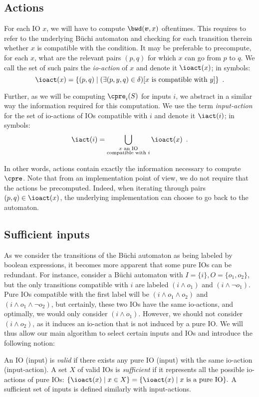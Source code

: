 \documentclass[runningheads,a4paper]{llncs}
\begin{document}
\subsection{Actions}

For each IO \(x\), we will have to compute \(\bwd(\vec{v}, x)\) oftentimes.  This
requires to refer to the underlying Büchi automaton and checking for each
transition therein whether \(x\) is compatible with the condition.  It may be
preferable to precompute, for each \(x\), what are the relevant pairs \((p, q)\) for
which \(x\) can go from \(p\) to \(q\).  We call the set of such pairs the
\emph{io-action} of \(x\) and denote it \(\ioact(x)\); in symbols:
\[\ioact(x) = \{(p, q) \mid (\exists (p, y, q) \in \delta)[x \text{ is compatible with }
y]\}\enspace.\]

Further, as we will be computing \(\cpre_i(S)\) for inputs \(i\), we abstract in a
similar way the information required for this computation.  We use the term
\emph{input-action} for the set of io-actions of IOs compatible with \(i\) and denote
it \(\iact(i)\); in symbols:
\[\iact(i) = \bigcup_{\substack{x \text{ an IO}\\\text{compatible with }i}} \ioact(x) \enspace.\]

In other words, actions contain exactly the information necessary to compute
\(\cpre\).  Note that from an implementation point of view, we do not require that
the actions be precomputed.  Indeed, when iterating through pairs
\((p, q) \in \ioact(x)\), the underlying implementation can choose to go back to the
automaton.

\subsection{Sufficient inputs}\label{sec:sufficient}

As we consider the transitions of the Büchi automaton as being labeled by
boolean expressions, it becomes more apparent that some pure IOs can be
redundant.  For instance, consider a Büchi automaton with
\(I = \{i\}, O = \{o_1, o_2\}\), but the only transitions compatible with \(i\) are
labeled \((i \land o_1)\) and \((i \land \neg o_1)\).  Pure IOs compatible with the first
label will be \((i \land o_1 \land o_2)\) and \((i \land o_1 \land \neg o_2)\), but
certainly, these two IOs have the same io-actions, and optimally, we would only
consider \((i \land o_1)\).  However, we should not consider \((i \land o_2)\), as
it induces an io-action that is not induced by a pure IO.  We will
thus allow our main algorithm to select certain inputs and IOs and introduce the
following notion:
\begin{definition}
  An IO (\resp input) is \emph{valid} if there exists any pure IO (\resp input)
  with the same io-action (\resp input-action).  A set \(X\) of valid IOs is
  \emph{sufficient} if it represents all the possible io-actions of pure IOs:
  \(\{\ioact(x) \mid x \in X\} = \{\ioact(x) \mid x \text{ is a pure IO}\}.\) A sufficient
  set of inputs is defined similarly with input-actions.
\end{definition}
\end{document}
